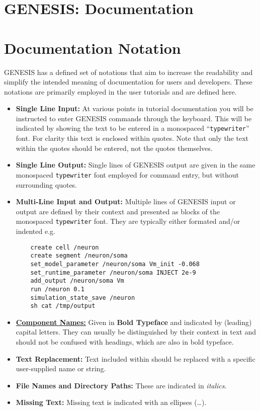 \documentclass[12pt]{article}
\begin{document}
\section*{GENESIS: Documentation}

\section*{Documentation Notation}

GENESIS has a defined set of notations that aim to increase the readability and simplify the intended meaning of documentation for users and developers. These notations are primarily employed in the user tutorials and are defined here.

\begin{itemize}

\item {\bf Single Line Input:} At various points in tutorial documentation you will be instructed to enter GENESIS commands through the keyboard. This will be indicated by showing the text to be entered in a monospaced ``{\tt typewriter}'' font. For clarity this text is enclosed within quotes. Note that only the text within the quotes should be entered, not the quotes themselves.

\item {\bf Single Line Output:} Single lines of GENESIS output are given in the same monospaced {\tt typewriter} font employed for command entry, but without surrounding quotes.

\item {\bf Multi-Line Input and Output:} Multiple lines of GENESIS input or output are defined by their context and presented as blocks of the monospaced {\tt typewriter} font. They are typically either formated and/or indented e.g.

\begin{verbatim}
    create cell /neuron
    create segment /neuron/soma
    set_model_parameter /neuron/soma Vm_init -0.068
    set_runtime_parameter /neuron/soma INJECT 2e-9
    add_output /neuron/soma Vm
    run /neuron 0.1
    simulation_state_save /neuron
    sh cat /tmp/output
\end{verbatim}

\item \href{../reserved-words/reserved-words.tex}{\bf Component Names:} Given in {\bf Bold Typeface} and indicated by (leading) capital letters. They can usually be distinguished by their context in text and should not be confused with headings, which are also in bold typeface.

\item {\bf Text Replacement:} Text included within {\tt <angle brackets>} should be replaced with a specific user-supplied name or string.

\item {\bf File Names and Directory Paths:} These are indicated in {\it italics}.

\item {\bf Missing Text:} Missing text is indicated with an ellipses (\ldots).

\end{itemize}
\end{document}
